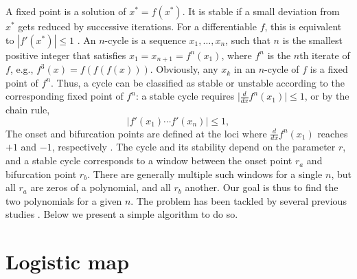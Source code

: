 \documentclass{ws-ijbc}
\begin{document}
A fixed point is a solution of $x^* = f(x^*)$.
%
It is stable if a small deviation from $x^*$
  gets reduced by successive iterations.
%
For a differentiable $f$,
  this is equivalent to $|f'(x^*)| \le 1$
  \cite{strogatz}.
%
An $n$-cycle is a sequence $x_1, \dots, x_n$,
  such that $n$ is the smallest positive integer
  that satisfies $x_1 = x_{n+1} = f^n(x_1)$,
  where $f^n$ is the $n$th iterate of $f$,
  e.g., $f^3(x) = f(f(f(x)))$.
Obviously, any $x_k$ in an $n$-cycle of $f$ is a fixed point of $f^n$.
%
%
%
Thus, a cycle can be classified as stable or unstable
  according to the corresponding fixed point of $f^n$:
  a stable cycle requires
  $\big| \frac {d} {dx} f^n(x_1) \big| \le 1$,
  or by the chain rule,
%
%
%
\begin{equation}
  \Big| f'(x_1) \cdots f'(x_n) \Big| \le 1,
\label{eq:der}
\end{equation}
%
%
The onset and bifurcation points
  are defined at the loci
  where $\frac {d} {dx} f^n(x_1)$ reaches $+1$ and $-1$,
  respectively \cite{strogatz}.
%
%
%
The cycle and its stability depend on the parameter $r$,
%
and a stable cycle corresponds to a window
  between the onset point $r_a$ and bifurcation point $r_b$.
%
There are generally multiple such windows for a single $n$,
  but all $r_a$ are zeros of a polynomial,
  and all $r_b$ another.
%
Our goal is thus to find the two polynomials for a given $n$.
%
The problem has been tackled by several previous studies
  \cite{brown1, brown2, stephenson1, stephenson2, stephenson3,
  saha, bechhoefer, gordon, burm, zhang, bailey1, bailey2, kk1, lewis}.
Below we present a simple algorithm to do so.
%
%
%
%







\section{\label{sec:logmap}Logistic map}
\end{document}
